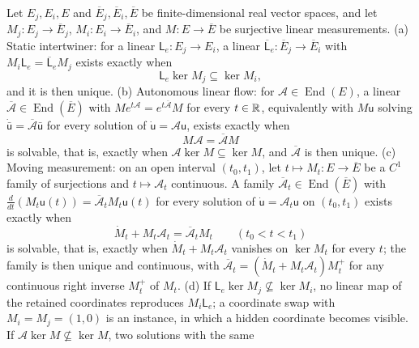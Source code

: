 Let \(E_j,E_i,E\) and \(\overline E_j,\overline E_i,\overline E\) be
finite-dimensional real vector spaces, and let \(M_j:E_j\to\overline E_j\),
\(M_i:E_i\to\overline E_i\), and \(M:E\to\overline E\) be surjective linear
measurements. (a) Static intertwiner: for a linear \(\mathsf L_e:E_j\to E_i\), a
linear \(\overline{\mathsf L}_e:\overline E_j\to\overline E_i\) with
\(M_i\mathsf L_e=\overline{\mathsf L}_eM_j\) exists exactly when
\begin{equation}
\mathsf L_e\ker M_j\subseteq\ker M_i,
\label{eq:geo-selective-descent}
\end{equation}
and it is then unique. (b) Autonomous linear flow: for
\(\mathcal A\in\operatorname{End}(E)\), a linear
\(\overline{\mathcal A}\in\operatorname{End}(\overline E)\) with
\(Me^{t\mathcal A}=e^{t\overline{\mathcal A}}M\) for every \(t\in\mathbb R\),
equivalently with \(M\mathsf u\) solving
\(\dot{\bar{\mathsf u}}=\overline{\mathcal A}\bar{\mathsf u}\) for every
solution of \(\dot{\mathsf u}=\mathcal A\mathsf u\), exists exactly when
\begin{equation}
M\mathcal A=\overline{\mathcal A}M
\label{eq:geo-selective-flow-descent}
\end{equation}
is solvable, that is, exactly when \(\mathcal A\ker M\subseteq\ker M\), and
\(\overline{\mathcal A}\) is then unique. (c) Moving measurement: on an open
interval \((t_0,t_1)\), let \(t\mapsto M_t:E\to\overline E\) be a \(C^1\)
family of surjections and \(t\mapsto\mathcal A_t\) continuous. A family
\(\overline{\mathcal A}_t\in\operatorname{End}(\overline E)\) with
\(\tfrac{d}{dt}(M_t\mathsf u(t))=\overline{\mathcal A}_tM_t\mathsf u(t)\) for
every solution of \(\dot{\mathsf u}=\mathcal A_t\mathsf u\) on \((t_0,t_1)\)
exists exactly when
\begin{equation}
\dot M_t+M_t\mathcal A_t=\overline{\mathcal A}_tM_t
\qquad(t_0<t<t_1)
\label{eq:geo-selective-moving-descent}
\end{equation}
is solvable, that is, exactly when \(\dot M_t+M_t\mathcal A_t\) vanishes on
\(\ker M_t\) for every \(t\); the family is then unique and continuous, with
\(\overline{\mathcal A}_t=(\dot M_t+M_t\mathcal A_t)M_t^+\) for any continuous
right inverse \(M_t^+\) of \(M_t\). (d) If
\(\mathsf L_e\ker M_j\not\subseteq\ker M_i\), no linear map of the retained
coordinates reproduces \(M_i\mathsf L_e\); a coordinate swap with
\(M_i=M_j=(1,0)\) is an instance, in which a hidden coordinate becomes visible.
If \(\mathcal A\ker M\not\subseteq\ker M\), two solutions with the same
